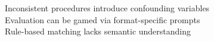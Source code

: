 \documentclass[preview]{standalone}
\begin{document}
Inconsistent procedures introduce confounding variables\\Evaluation can be gamed via format-specific prompts\\Rule-based matching lacks semantic understanding\\
\end{document}
